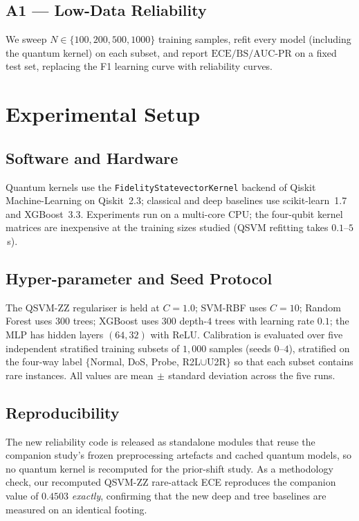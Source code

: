 \documentclass[journal]{IEEEtran}
\newcommand{\ZZ}{\textsc{ZZ}}
\newcommand{\QSVM}{QSVM-\ZZ}
\newcommand{\ECE}{\mathrm{ECE}}
\newcommand{\Brier}{\mathrm{BS}}
\begin{document}
\subsection{A1 --- Low-Data Reliability}
We sweep $N\in\{100,200,500,1000\}$ training samples, refit every model
(including the quantum kernel) on each subset, and report
$\ECE/\Brier/\text{AUC-PR}$ on a fixed test set, replacing the F1
learning curve with reliability curves.

\section{Experimental Setup}\label{sec:setup}

\subsection{Software and Hardware}
Quantum kernels use the \texttt{FidelityStatevectorKernel} backend of
Qiskit Machine-Learning on Qiskit~2.3; classical and deep baselines use
scikit-learn~1.7 and XGBoost~3.3. Experiments run on a multi-core CPU;
the four-qubit kernel matrices are inexpensive at the training sizes
studied (QSVM refitting takes $0.1$--$5$\,s).

\subsection{Hyper-parameter and Seed Protocol}
The \QSVM{} regulariser is held at $C{=}1.0$; SVM-RBF uses $C{=}10$;
Random Forest uses $300$ trees; XGBoost uses $300$ depth-$4$ trees with
learning rate $0.1$; the MLP has hidden layers $(64,32)$ with ReLU.
Calibration is evaluated over five independent stratified training
subsets of $1{,}000$ samples (seeds $0$--$4$), stratified on the
four-way label $\{$Normal, DoS, Probe, R2L$\cup$U2R$\}$ so that each
subset contains rare instances. All values are mean$\,\pm\,$standard
deviation across the five runs.

\subsection{Reproducibility}
The new reliability code is released as standalone modules that reuse the
companion study's frozen preprocessing artefacts and cached quantum
models, so no quantum kernel is recomputed for the prior-shift study. As
a methodology check, our recomputed \QSVM{} rare-attack ECE reproduces
the companion value of $0.4503$ \emph{exactly}, confirming that the new
deep and tree baselines are measured on an identical footing.
\end{document}
